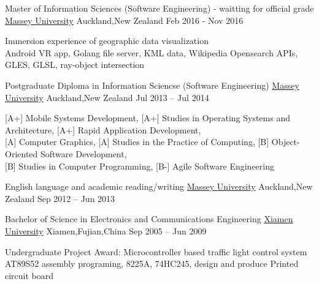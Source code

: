 
\begin{cventries}
\cventry
{Master of Information Sciences (Software Engineering) - waitting for official grade}
{\href{http://www.massey.ac.nz/}{Massey University}}
{Auckland,\enskip New Zealand}
{Feb 2016 - Nov 2016}
{
	\begin{cvitems}
		\item {Immersion experience of geographic data visualization\\
			Android VR app, Golang file server, KML data, Wikipedia Opensearch APIs, GLES, GLSL, ray-object intersection}
	\end{cvitems}
}
\end{cventries}

\begin{cventries}
	\cventry
	{Postgraduate Diploma in Information Sciencse (Software Engineering)}
	{\href{http://www.massey.ac.nz/}{Massey University}}
	{Auckland,\enskip New Zealand}
	{Jul 2013 – Jul 2014}
	{
		\begin{cvitems}
			\item{[A+] Mobile Systems Development},\enskip
			{[A+] Studies in Operating Systems and Architecture},\enskip
			{[A+] Rapid Application Development},\enskip\\
			{[A] Computer Graphics},\enskip
			{[A] Studies in the Practice of Computing},\enskip
			{[B] Object-Oriented Software Development},\enskip\\
			{[B] Studies in Computer Programming},\enskip
			{[B-] Agile Software Engineering}\enskip
		\end{cvitems}
	}
\end{cventries}

\begin{cventries}
	\cventry
	{English language and academic reading/writing}
	{\href{http://www.massey.ac.nz/}{Massey University}}
	{Auckland,\enskip New Zealand}
	{Sep 2012 – Jun 2013}
	{
		\begin{cvitems}
		\end{cvitems}
	}
\end{cventries}

\begin{cventries}
	\cventry
	{Bachelor of Science in Electronics and Communications Engineering}
	{\href{http://www.xmu.edu.cn/en/}{Xiamen University}}
	{Xiamen,\enskip Fujian,\enskip China}
	{Sep 2005 – Jun 2009}
	{
		\begin{cvitems}
			\item {Undergraduate Project Award: Microcontroller based traffic light control system\\
			AT89S52 assembly programing, 8225A, 74HC245, design and produce Printed circuit board}
		\end{cvitems}
	}
\end{cventries}

